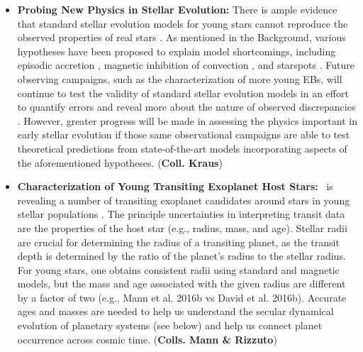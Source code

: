\begin{itemize}
	\item {\bf Probing New Physics in Stellar Evolution:} There is ample evidence that standard stellar evolution models for young stars cannot reproduce the observed properties of real stars \citep[e.g.,][]{Hillenbrand2004, Soderblom2014, Stassun2014}. As mentioned in the Background, various hypotheses have been proposed to explain model shortcomings, including episodic accretion \citep[e.g.,][]{Baraffe2009}, magnetic inhibition of convection \citep[e.g.,][]{Feiden2016}, and starspots \citep[e.g.,][]{Jackson2009}. Future observing campaigns, such as the characterization of more young EBs, will continue to test the validity of standard stellar evolution models in an effort to quantify errors and reveal more about the nature of observed discrepancies \citep[e.g.,][]{Kraus2015}. However, greater progress will be made in assessing the physics important in early stellar evolution if those same observational campaigns are able to test theoretical predictions from state-of-the-art models incorporating aspects of the aforementioned hypotheses. ({\bf Coll. Kraus}) \\

	\item {\bf Characterization of Young Transiting Exoplanet Host Stars:} \kepler\ is revealing a number of transiting exoplanet candidates around stars in young stellar populations \citep[e.g,][]{Mann2016b, Mann2016, David2016b}. The principle uncertainties in interpreting transit data are the properties of the host star (e.g., radius, mass, and age). Stellar radii are crucial for determining the radius of a transiting planet, as the transit depth is determined by the ratio of the planet's radius to the stellar radius. For young stars, one obtains consistent radii using standard and magnetic models, but the mass and age associated with the given radius are different by a factor of two (e.g., Mann et al. 2016b vs David et al. 2016b). Accurate ages and masses are needed to help us understand the secular dynamical evolution of planetary systems (see below) and help us connect planet occurrence across cosmic time. ({\bf Colls. Mann \& Rizzuto})   \\
	

\end{itemize}
